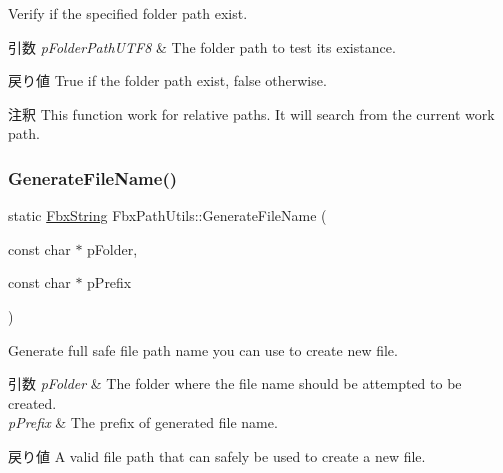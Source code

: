 Verify if the specified folder path exist. 
\begin{DoxyParams}{引数}
{\em p\+Folder\+Path\+U\+T\+F8} & The folder path to test its existance. \\
\hline
\end{DoxyParams}
\begin{DoxyReturn}{戻り値}
True if the folder path exist, false otherwise. 
\end{DoxyReturn}
\begin{DoxyRemark}{注釈}
This function work for relative paths. It will search from the current work path. 
\end{DoxyRemark}
\mbox{\label{class_fbx_path_utils_a0680775ad53444cc7dd91bdd537384ca}} 
\subsubsection{\texorpdfstring{Generate\+File\+Name()}{GenerateFileName()}}
{\footnotesize\ttfamily static \hyperlink{class_fbx_string}{Fbx\+String} Fbx\+Path\+Utils\+::\+Generate\+File\+Name (\begin{DoxyParamCaption}\item[{const char $\ast$}]{p\+Folder,  }\item[{const char $\ast$}]{p\+Prefix }\end{DoxyParamCaption})\hspace{0.3cm}{\ttfamily [static]}}

Generate full safe file path name you can use to create new file. 
\begin{DoxyParams}{引数}
{\em p\+Folder} & The folder where the file name should be attempted to be created. \\
\hline
{\em p\+Prefix} & The prefix of generated file name. \\
\hline
\end{DoxyParams}
\begin{DoxyReturn}{戻り値}
A valid file path that can safely be used to create a new file. 
\end{DoxyReturn}
\mbox{\label{class_fbx_path_utils_a2f8743324b82737499681bdaca5adc7e}} 
